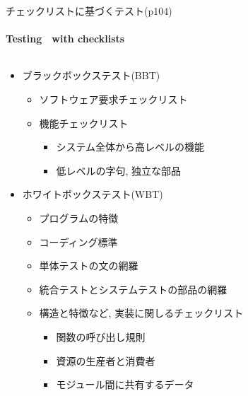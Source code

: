 
\begin{frame}[shrink=15]{チェックリストに基づくテスト(p104)}
\framesubtitle{Testing　with checklists}
\begin{columns}[t]
    \begin{column}{.6\textwidth}
    \begin{itemize}
    \item ブラックボックステスト(BBT)
        \begin{itemize}
        \item ソフトウェア要求チェックリスト
        \item 機能チェックリスト
            \begin{itemize}
            \item システム全体から高レベルの機能
            \item 低レベルの字句, 独立な部品
            \end{itemize}
        \end{itemize}
    \item ホワイトボックステスト(WBT)
        \begin{itemize}
        \item プログラムの特徴
        \item コーディング標準
        \item 単体テストの文の網羅
        \item 統合テストとシステムテストの部品の網羅
        \item 構造と特徴など, 実装に関しるチェックリスト
            \begin{itemize}
            \item 関数の呼び出し規則
            \item 資源の生産者と消費者
            \item モジュール間に共有するデータ
            \end{itemize}
        \end{itemize}
    \end{itemize}
    \end{column}
        \begin{column}{.35\textwidth}

\end{column}
\end{columns}
\end{frame}
